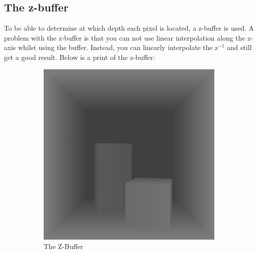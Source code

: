 \documentclass[a4paper,11pt]{article}
\begin{document}
\subsection{The z-buffer}
To be able to determine at which depth each pixel is located, a z-buffer is used. A problem with the z-buffer is that you can not use linear interpolation along the z-axis whilst using the buffer. Instead, you can linearly interpolate the z$^{-1}$ and still get a good result. Below is a print of the z-buffer:
\begin{figure}[h!]
	\centering
	\begin{subfigure}[h]{0.4\linewidth}
		\centering
		\includegraphics[width=\linewidth]{screenshotz.png}
		\caption{The Z-Buffer}
		\label{figz}
	\end{subfigure}
	\begin{subfigure}[h!]{0.4\linewidth}
		\centering

\end{subfigure}
\end{figure}
\end{document}
